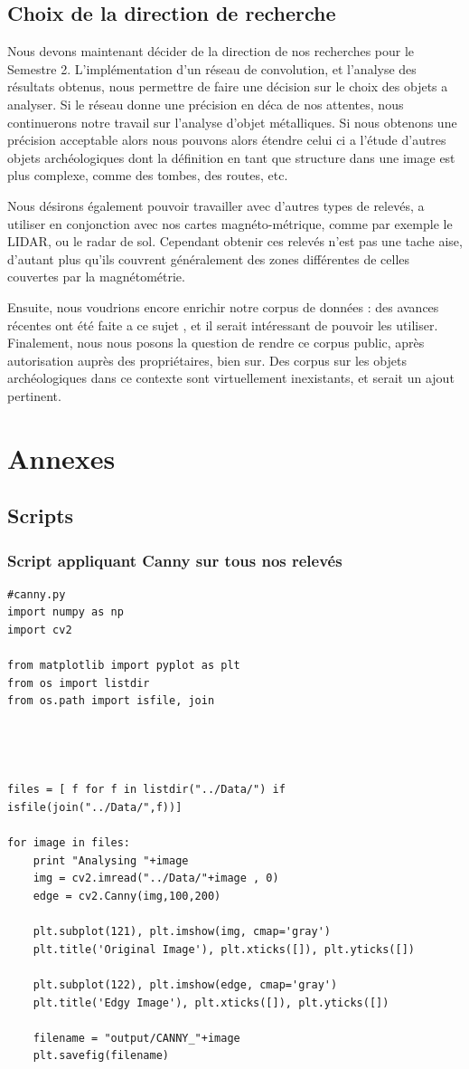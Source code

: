 \documentclass[a4paper, 12pt, titlepage, oneside, french]{article}
\begin{document}
	\subsection{Choix de la direction de recherche}
	Nous devons maintenant décider de la direction de nos recherches pour le Semestre 2. L'implémentation d'un réseau de convolution, et l'analyse des résultats obtenus, nous permettre de faire une décision sur le choix des objets a analyser. Si le réseau donne une précision en déca de nos attentes, nous continuerons notre travail sur l'analyse d'objet métalliques. Si nous obtenons une précision acceptable alors nous pouvons alors étendre celui ci a l'étude d'autres objets archéologiques dont la définition en tant que structure dans une image est plus complexe, comme des tombes, des routes, etc. 

	Nous désirons également pouvoir travailler avec d'autres types de relevés, a utiliser en conjonction avec nos cartes magnéto-métrique, comme par exemple le LIDAR, ou le radar de sol. Cependant obtenir ces relevés n'est pas une tache aise, d'autant plus qu'ils couvrent généralement des zones différentes de celles couvertes par la magnétométrie.

	Ensuite, nous voudrions encore enrichir notre corpus de données : des avances récentes ont été faite a ce sujet \cite{Transfo}, et il serait intéressant de pouvoir les utiliser. Finalement, nous nous posons la question de rendre ce corpus public, après autorisation auprès des propriétaires, bien sur. Des corpus sur les objets archéologiques dans ce contexte sont virtuellement inexistants, et serait un ajout pertinent. 
\newpage
\section{Annexes}




\subsection{Scripts}
\subsubsection{Script appliquant Canny sur tous nos relevés}
\begin{verbatim}
#canny.py
import numpy as np
import cv2

from matplotlib import pyplot as plt
from os import listdir
from os.path import isfile, join




files = [ f for f in listdir("../Data/") if isfile(join("../Data/",f))]

for image in files:
    print "Analysing "+image
    img = cv2.imread("../Data/"+image , 0)
    edge = cv2.Canny(img,100,200)

    plt.subplot(121), plt.imshow(img, cmap='gray')
    plt.title('Original Image'), plt.xticks([]), plt.yticks([])

    plt.subplot(122), plt.imshow(edge, cmap='gray')
    plt.title('Edgy Image'), plt.xticks([]), plt.yticks([])

    filename = "output/CANNY_"+image
    plt.savefig(filename)
\end{verbatim}
\end{document}

